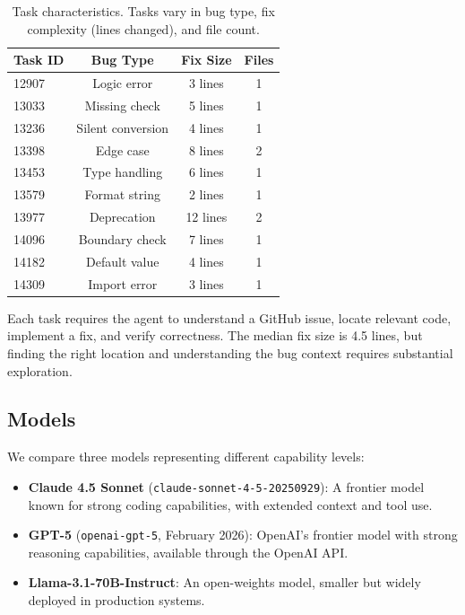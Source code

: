 \documentclass{article}
\begin{document}
\begin{table}[t]
\caption{Task characteristics. Tasks vary in bug type, fix complexity (lines changed), and file count.}
\label{tab:tasks}
\vskip 0.15in
\begin{center}
\begin{small}
\begin{tabular}{lccc}
\toprule
Task ID & Bug Type & Fix Size & Files \\
\midrule
12907 & Logic error & 3 lines & 1 \\
13033 & Missing check & 5 lines & 1 \\
13236 & Silent conversion & 4 lines & 1 \\
13398 & Edge case & 8 lines & 2 \\
13453 & Type handling & 6 lines & 1 \\
13579 & Format string & 2 lines & 1 \\
13977 & Deprecation & 12 lines & 2 \\
14096 & Boundary check & 7 lines & 1 \\
14182 & Default value & 4 lines & 1 \\
14309 & Import error & 3 lines & 1 \\
\bottomrule
\end{tabular}
\end{small}
\end{center}
\vskip -0.1in
\end{table}

Each task requires the agent to understand a GitHub issue, locate relevant code, implement a fix, and verify correctness. The median fix size is 4.5 lines, but finding the right location and understanding the bug context requires substantial exploration.

\subsection{Models}

We compare three models representing different capability levels:

\begin{itemize}
    \item \textbf{Claude 4.5 Sonnet} (\texttt{claude-sonnet-4-5-20250929}): A frontier model known for strong coding capabilities, with extended context and tool use.
    \item \textbf{GPT-5} (\texttt{openai-gpt-5}, February 2026): OpenAI's frontier model with strong reasoning capabilities, available through the OpenAI API.
    \item \textbf{Llama-3.1-70B-Instruct}: An open-weights model, smaller but widely deployed in production systems.
\end{itemize}
\end{document}
